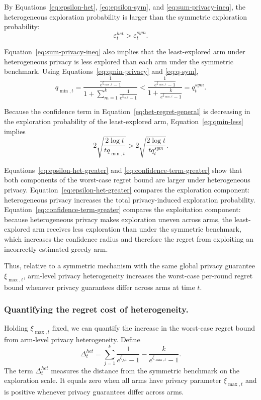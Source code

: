 \documentclass[mksc,nonblindrev]{informs3}
\begin{document}
\begin{APPENDICES}
By Equations~\eqref{eq:epsilon-het}, \eqref{eq:epsilon-sym}, and \eqref{eq:sum-privacy-ineq}, the heterogeneous exploration probability is larger than the symmetric exploration probability:
\begin{equation}
\label{eq:epsilon-het-greater}
\varepsilon_t^{het}
>
\varepsilon_t^{sym}.
\end{equation}

Equation~\eqref{eq:sum-privacy-ineq} also implies that the least-explored arm under heterogeneous privacy is less explored than each arm under the symmetric benchmark. Using Equations~\eqref{eq:qmin-privacy} and \eqref{eq:q-sym},
\begin{equation}
\label{eq:qmin-less}
q_{\min,t}
=
\frac{
\frac{1}{e^{\xi_{\max,t}}-1}
}{
1+\sum_{m=1}^k \frac{1}{e^{\xi_{m,t}}-1}
}
<
\frac{
\frac{1}{e^{\xi_{\max,t}}-1}
}{
1+\frac{k}{e^{\xi_{\max,t}}-1}
}
=
q_t^{sym}.
\end{equation}

Because the confidence term in Equation~\eqref{eq:het-regret-general} is decreasing in the exploration probability of the least-explored arm, Equation~\eqref{eq:qmin-less} implies
\begin{equation}
\label{eq:confidence-term-greater}
2\sqrt{
\frac{2\log t}{tq_{\min,t}}
}
>
2\sqrt{
\frac{2\log t}{tq_t^{sym}}
}.
\end{equation}

Equations~\eqref{eq:epsilon-het-greater} and
\eqref{eq:confidence-term-greater} show that both components of the worst-case regret bound are larger under heterogeneous privacy. Equation~\eqref{eq:epsilon-het-greater} compares the exploration component: heterogeneous privacy increases the total privacy-induced exploration probability. Equation~\eqref{eq:confidence-term-greater} compares the exploitation component: because heterogeneous privacy makes exploration uneven across arms, the least-explored arm receives less exploration than under the symmetric benchmark, which increases the confidence radius and therefore the regret from exploiting an incorrectly estimated greedy arm.

Thus, relative to a symmetric mechanism with the same global privacy guarantee $\xi_{\max,t}$, arm-level privacy heterogeneity increases the worst-case per-round regret bound whenever privacy guarantees differ across arms at time $t$.


\subsubsection{Quantifying the regret cost of heterogeneity.}\label{app:costheterogeneity}
Holding $\xi_{\max,t}$ fixed, we can quantify the increase in the worst-case regret bound from arm-level privacy heterogeneity. Define
\begin{equation}
\label{eq:heterogeneity-gap}
\Delta_t^{het}
=
\sum_{j=1}^k
\frac{1}{e^{\xi_{j,t}}-1}
-
\frac{k}{e^{\xi_{\max,t}}-1}.
\end{equation}
The term $\Delta_t^{het}$ measures the distance from the symmetric benchmark on the exploration scale. It equals zero when all arms have privacy parameter $\xi_{\max,t}$ and is positive whenever privacy guarantees differ across arms.


\end{APPENDICES}
\end{document}
